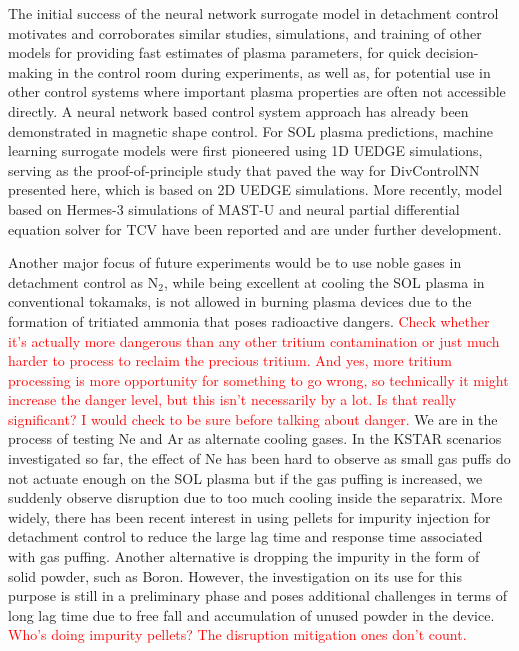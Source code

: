 The initial success of the neural network surrogate model in detachment control motivates and corroborates similar studies, simulations, and training of other models for providing fast estimates of plasma parameters, for quick decision-making in the control room during experiments, as well as, for potential use in other control systems where important plasma properties are often not accessible directly.
A neural network based control system approach has already been demonstrated in magnetic shape control\cite{Degrave_2022_Nature}.
For \ac{SOL} plasma predictions, machine learning surrogate models were first pioneered using 1D UEDGE simulations\cite{Zhu_2022_JPP}, serving as the proof-of-principle study that paved the way for DivControlNN presented here, which is based on 2D UEDGE simulations.
More recently, model based on Hermes-3\cite{Dudson_2024_CPC} simulations of MAST-U\cite{Holt_2024_NF} and neural partial differential equation solver for TCV\cite{Poels_2023_NF} have been reported and are under further development.

Another major focus of future experiments would be to use noble gases in detachment control as N$_2$, while being excellent at cooling the SOL plasma in conventional tokamaks, is not allowed in burning plasma devices due to the formation of tritiated ammonia that poses radioactive dangers.
\textcolor{red}{Check whether it's actually more dangerous than any other tritium contamination or just much harder to process to reclaim the precious tritium. And yes, more tritium processing is more opportunity for something to go wrong, so technically it might increase the danger level, but this isn't necessarily by a lot. Is that really significant? I would check to be sure before talking about danger.}
We are in the process of testing Ne and Ar as alternate cooling gases.
In the KSTAR scenarios investigated so far, the effect of Ne has been hard to observe as small gas puffs do not actuate enough on the \ac{SOL} plasma but if the gas puffing is increased, we suddenly observe disruption due to too much cooling inside the separatrix.
More widely, there has been recent interest in using pellets for impurity injection for detachment control to reduce the large lag time and response time associated with gas puffing.
Another alternative is dropping the impurity in the form of solid powder, such as Boron.
However, the investigation on its use for this purpose is still in a preliminary phase and poses additional challenges in terms of long lag time due to free fall and accumulation of unused powder in the device.
\textcolor{red}{Who's doing impurity pellets? The disruption mitigation ones don't count.}
